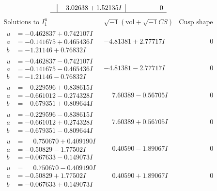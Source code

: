 \documentclass[1p]{elsarticle_modified}
\theoremstyle{definition}
\newcommand{\I}{\sqrt{-1}}
\begin{document}
$$\begin{array}{c|c|c}
 & -3.02638 + 1.52135 I & \phantom{-0.000000 } 0\\
 \hline 
 \end{array}$$\newpage$$\begin{array}{c|c|c}  
\text{Solutions to }I^u_{1}& \I (\text{vol} + \sqrt{-1}CS) & \text{Cusp shape}\\
 \hline 
\begin{aligned}
u &= -0.462837 + 0.742107 I \\
a &= -0.141675 + 0.465436 I \\
b &= -1.21146 + 0.76832 I\end{aligned}
 & -4.81381 + 2.77717 I & \phantom{-0.000000 } 0 \\ \hline\begin{aligned}
u &= -0.462837 - 0.742107 I \\
a &= -0.141675 - 0.465436 I \\
b &= -1.21146 - 0.76832 I\end{aligned}
 & -4.81381 - 2.77717 I & \phantom{-0.000000 } 0 \\ \hline\begin{aligned}
u &= -0.229596 + 0.838615 I \\
a &= -0.661012 - 0.274328 I \\
b &= -0.679351 + 0.809644 I\end{aligned}
 & \phantom{-}7.60389 - 0.56705 I & \phantom{-0.000000 } 0 \\ \hline\begin{aligned}
u &= -0.229596 - 0.838615 I \\
a &= -0.661012 + 0.274328 I \\
b &= -0.679351 - 0.809644 I\end{aligned}
 & \phantom{-}7.60389 + 0.56705 I & \phantom{-0.000000 } 0 \\ \hline\begin{aligned}
u &= \phantom{-}0.750670 + 0.409190 I \\
a &= -0.50829 - 1.77502 I \\
b &= -0.067633 - 0.149073 I\end{aligned}
 & \phantom{-}0.40590 - 1.89067 I & \phantom{-0.000000 } 0 \\ \hline\begin{aligned}
u &= \phantom{-}0.750670 - 0.409190 I \\
a &= -0.50829 + 1.77502 I \\
b &= -0.067633 + 0.149073 I\end{aligned}
 & \phantom{-}0.40590 + 1.89067 I & \phantom{-0.000000 } 0 \\ \hline\begin{aligned}

\end{aligned}
\end{array}$$
\end{document}
